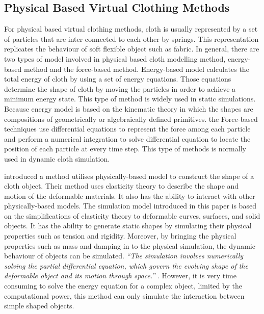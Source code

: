 \subsection{Physical Based Virtual Clothing Methods}
For physical based virtual clothing methods, cloth is usually represented by a set of particles that are inter-connected to each other by springs. This representation replicates the behaviour of soft flexible object such as fabric. In general, there are two types of model involved in physical based cloth modelling method, energy-based method and the force-based method. Energy-based model calculates the total energy of cloth by using a set of energy equations. Those equations determine the shape of cloth by moving the particles in order to achieve a minimum energy state. This type of method is widely used in static simulations. Because energy model is based on the kinematic theory in which the shapes are compositions of geometrically or algebraically defined primitives. the Force-based techniques use differential equations to represent the force among each particle and perform a numerical integration to solve differential equation to locate the position of each particle at every time step. This type of methods is normally used in dynamic cloth simulation. 

 introduced a method utilises physically-based model to construct the shape of a cloth object. Their method uses elasticity theory to describe the shape and motion of the deformable materials. It also has the ability to interact with other physically-based models. The simulation model introduced in this paper is based on the simplifications of elasticity theory to deformable curves, surfaces, and solid objects. It has the ability to generate static shapes by simulating their physical properties such as tension and rigidity. Moreover, by bringing the physical properties such as mass and damping in to the physical simulation, the dynamic behaviour of objects can be simulated. \textit{``The simulation involves numerically solving the partial differential equation, which govern the evolving shape of the deformable object and its motion through space.''} . However, it is very time consuming to solve the energy equation for a complex object, limited by the computational power, this method can only simulate the interaction between simple shaped objects.




